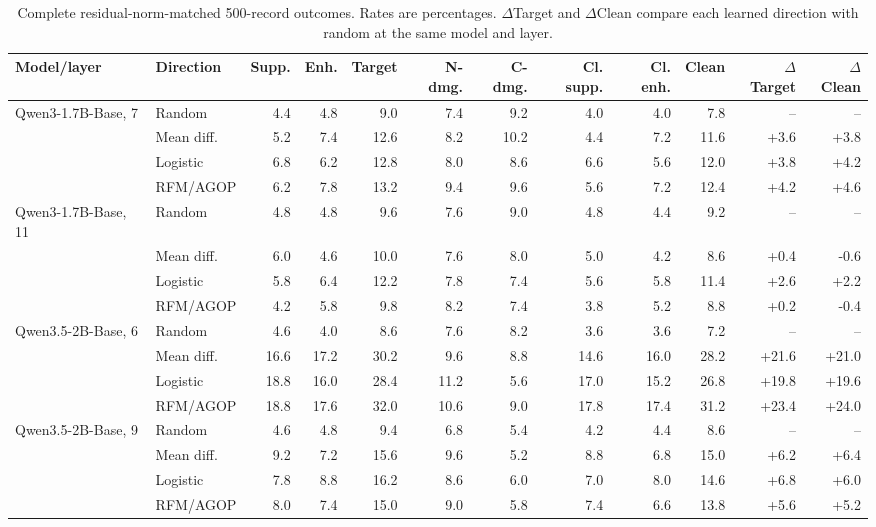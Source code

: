 \begin{table}[t]
\centering

\scriptsize
\setlength{\tabcolsep}{2.0pt}
\caption{Complete residual-norm-matched 500-record outcomes. Rates are percentages. $\Delta$Target and $\Delta$Clean compare each learned direction with random at the same model and layer.}
\label{tab:cross-model-outcomes-full}
\begin{tabular}{llrrrrrrrrrr}
\toprule
Model/layer & Direction & Supp. & Enh. & Target & N-dmg. & C-dmg. & Cl. supp. & Cl. enh. & Clean & $\Delta$Target & $\Delta$Clean \\
\midrule
Qwen3-1.7B-Base, 7 & Random & 4.4 & 4.8 & 9.0 & 7.4 & 9.2 & 4.0 & 4.0 & 7.8 & -- & -- \\
 & Mean diff. & 5.2 & 7.4 & 12.6 & 8.2 & 10.2 & 4.4 & 7.2 & 11.6 & +3.6 & +3.8 \\
 & Logistic & 6.8 & 6.2 & 12.8 & 8.0 & 8.6 & 6.6 & 5.6 & 12.0 & +3.8 & +4.2 \\
 & RFM/AGOP & 6.2 & 7.8 & 13.2 & 9.4 & 9.6 & 5.6 & 7.2 & 12.4 & +4.2 & +4.6 \\
\addlinespace[0.8pt]
Qwen3-1.7B-Base, 11 & Random & 4.8 & 4.8 & 9.6 & 7.6 & 9.0 & 4.8 & 4.4 & 9.2 & -- & -- \\
 & Mean diff. & 6.0 & 4.6 & 10.0 & 7.6 & 8.0 & 5.0 & 4.2 & 8.6 & +0.4 & -0.6 \\
 & Logistic & 5.8 & 6.4 & 12.2 & 7.8 & 7.4 & 5.6 & 5.8 & 11.4 & +2.6 & +2.2 \\
 & RFM/AGOP & 4.2 & 5.8 & 9.8 & 8.2 & 7.4 & 3.8 & 5.2 & 8.8 & +0.2 & -0.4 \\
\midrule
Qwen3.5-2B-Base, 6 & Random & 4.6 & 4.0 & 8.6 & 7.6 & 8.2 & 3.6 & 3.6 & 7.2 & -- & -- \\
 & Mean diff. & 16.6 & 17.2 & 30.2 & 9.6 & 8.8 & 14.6 & 16.0 & 28.2 & +21.6 & +21.0 \\
 & Logistic & 18.8 & 16.0 & 28.4 & 11.2 & 5.6 & 17.0 & 15.2 & 26.8 & +19.8 & +19.6 \\
 & RFM/AGOP & 18.8 & 17.6 & 32.0 & 10.6 & 9.0 & 17.8 & 17.4 & 31.2 & +23.4 & +24.0 \\
\addlinespace[0.8pt]
Qwen3.5-2B-Base, 9 & Random & 4.6 & 4.8 & 9.4 & 6.8 & 5.4 & 4.2 & 4.4 & 8.6 & -- & -- \\
 & Mean diff. & 9.2 & 7.2 & 15.6 & 9.6 & 5.2 & 8.8 & 6.8 & 15.0 & +6.2 & +6.4 \\
 & Logistic & 7.8 & 8.8 & 16.2 & 8.6 & 6.0 & 7.0 & 8.0 & 14.6 & +6.8 & +6.0 \\
 & RFM/AGOP & 8.0 & 7.4 & 15.0 & 9.0 & 5.8 & 7.4 & 6.6 & 13.8 & +5.6 & +5.2 \\

\end{tabular}
\end{table}
